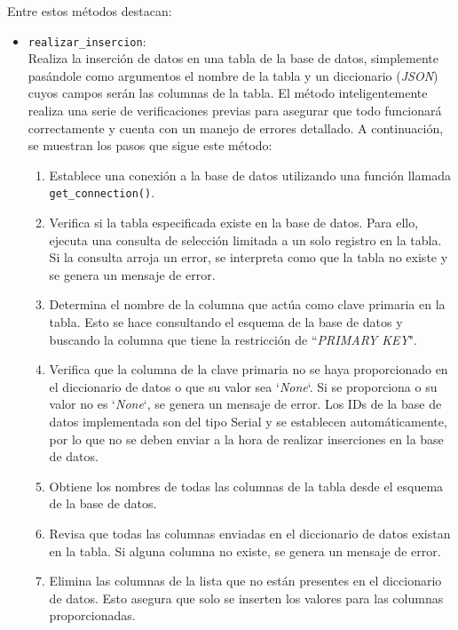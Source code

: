 \documentclass[12pt]{report}
\begin{document}
Entre estos métodos destacan:
\begin{itemize}
    \item \texttt{realizar\_insercion}:
    \\
    Realiza la inserción de datos en una tabla de la base de datos, simplemente pasándole como argumentos el nombre de la tabla y un diccionario (\textit{JSON}) cuyos campos serán las columnas de la tabla. El método inteligentemente realiza una serie de verificaciones previas para asegurar que todo funcionará correctamente y cuenta con un manejo de errores detallado. A continuación, se muestran los pasos que sigue este método:

\begin{enumerate}
    \item Establece una conexión a la base de datos utilizando una función llamada \texttt{get\_connection()}.
    
    \item Verifica si la tabla especificada existe en la base de datos. Para ello, ejecuta una consulta de selección limitada a un solo registro en la tabla. Si la consulta arroja un error, se interpreta como que la tabla no existe y se genera un mensaje de error.
    
    \item Determina el nombre de la columna que actúa como clave primaria en la tabla. Esto se hace consultando el esquema de la base de datos y buscando la columna que tiene la restricción de ``\textit{PRIMARY KEY}".
    
    \item Verifica que la columna de la clave primaria no se haya proporcionado en el diccionario de datos o que su valor sea `\textit{None}`. Si se proporciona o su valor no es `\textit{None}`, se genera un mensaje de error. Los IDs de la base de datos implementada son del tipo Serial y se establecen automáticamente, por lo que no se deben enviar a la hora de realizar inserciones en la base de datos.
    
    \item Obtiene los nombres de todas las columnas de la tabla desde el esquema de la base de datos.
    
    \item Revisa que todas las columnas enviadas en el diccionario de datos existan en la tabla. Si alguna columna no existe, se genera un mensaje de error.
    
    \item Elimina las columnas de la lista que no están presentes en el diccionario de datos. Esto asegura que solo se inserten los valores para las columnas proporcionadas.
    

\end{enumerate}
\end{itemize}
\end{document}
